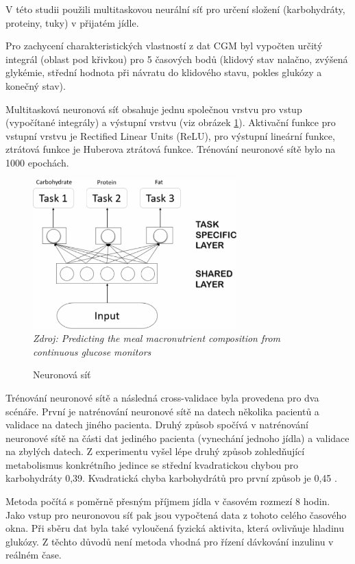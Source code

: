 V této studii \citet{Analyza.Neuronka} použili multitaskovou neurální síť pro určení složení (karbohydráty, proteiny, tuky) v přijatém jídle.

Pro zachycení charakteristických vlastností z dat CGM byl vypočten určitý integrál (oblast pod křivkou) pro 5 časových bodů (klidový stav nalačno, zvýšená glykémie, střední hodnota při návratu do klidového stavu, pokles glukózy a konečný stav).

Multitasková neuronová síť obsahuje jednu společnou vrstvu pro vstup (vypočítané integrály) a výstupní vrstvu (viz obrázek \ref{fig:neuronka}). Aktivační funkce pro vstupní vrstvu je Rectified Linear Units (ReLU), pro výstupní lineární funkce, ztrátová funkce je Huberova ztrátová funkce. Trénování neuronové sítě bylo na 1000 epochách.

\begin{figure}[H]
\caption{Neuronová síť}
\label{fig:neuronka}
\centering
\includegraphics[width=0.7\textwidth]{img/analyza/neuronka.png}\\
\textit{Zdroj: Predicting the meal macronutrient composition from continuous glucose monitors \citep{Analyza.Neuronka}}
\end{figure}

Trénování neuronové sítě a následná cross-validace byla provedena pro dva scénáře. První je natrénování neuronové sítě na datech několika pacientů a validace na datech jiného pacienta. Druhý způsob spočívá v natrénování neuronové sítě na části dat jediného pacienta (vynechání jednoho jídla) a validace na zbylých datech. Z experimentu vyšel lépe druhý způsob zohledňující metabolismus konkrétního jedince se střední kvadratickou chybou pro karbohydráty 0,39. Kvadratická chyba karbohydrátů pro první způsob je 0,45 \citep{Analyza.Neuronka}. 

Metoda počítá s poměrně přesným příjmem jídla v časovém rozmezí 8 hodin. Jako vstup pro neuronovou síť pak jsou vypočtená data z tohoto celého časového okna. Při sběru dat byla také vyloučená fyzická aktivita, která ovlivňuje hladinu glukózy. Z těchto důvodů není metoda vhodná pro řízení dávkování inzulinu v reálném čase.


